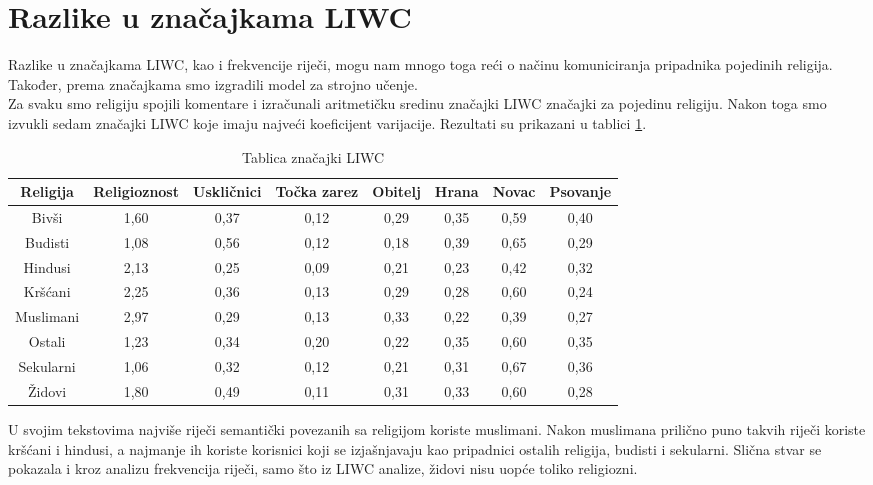 \documentclass[times,utf8,zavrsni]{fer}
\begin{document}
\newpage

\section{Razlike u značajkama LIWC}

Razlike u značajkama LIWC, kao i frekvencije riječi, mogu nam mnogo toga reći o načinu komuniciranja pripadnika pojedinih religija. Također, prema značajkama smo izgradili model za strojno učenje. \\

Za svaku smo religiju spojili komentare i izračunali aritmetičku sredinu značajki LIWC značajki za pojedinu religiju. Nakon toga smo izvukli sedam značajki LIWC koje imaju najveći koeficijent varijacije. Rezultati su prikazani u tablici \ref{table:liwc}. \\

\begin{table}[h!]
\small
\centering
\caption{Tablica značajki LIWC}
\label{table:liwc}
\begin{tabular}{@{}cccccccc@{}}
\hline
Religija  & Religioznost & Uskličnici & Točka zarez & Obitelj & Hrana & Novac & Psovanje \\
\hline
\hline
Bivši     & 1,60         & 0,37       & 0,12        & 0,29    & 0,35  & 0,59  & 0,40     \\
Budisti   & 1,08         & 0,56       & 0,12        & 0,18    & 0,39  & 0,65  & 0,29     \\
Hindusi   & 2,13         & 0,25       & 0,09        & 0,21    & 0,23  & 0,42  & 0,32     \\
Kršćani   & 2,25         & 0,36       & 0,13        & 0,29    & 0,28  & 0,60  & 0,24     \\
Muslimani & 2,97         & 0,29       & 0,13        & 0,33    & 0,22  & 0,39  & 0,27     \\
Ostali    & 1,23         & 0,34       & 0,20        & 0,22    & 0,35  & 0,60  & 0,35     \\
Sekularni & 1,06         & 0,32       & 0,12        & 0,21    & 0,31  & 0,67  & 0,36     \\
Židovi    & 1,80         & 0,49       & 0,11        & 0,31    & 0,33  & 0,60  & 0,28     \\

\hline
\end{tabular}
\end{table}


U svojim tekstovima najviše riječi semantički povezanih sa religijom koriste muslimani. Nakon muslimana prilično puno takvih riječi koriste kršćani i hindusi, a najmanje  ih koriste korisnici koji se izjašnjavaju kao pripadnici ostalih religija, budisti i sekularni. Slična stvar se pokazala i kroz analizu frekvencija riječi, samo što iz LIWC analize, židovi nisu uopće toliko religiozni. \\
\end{document}
